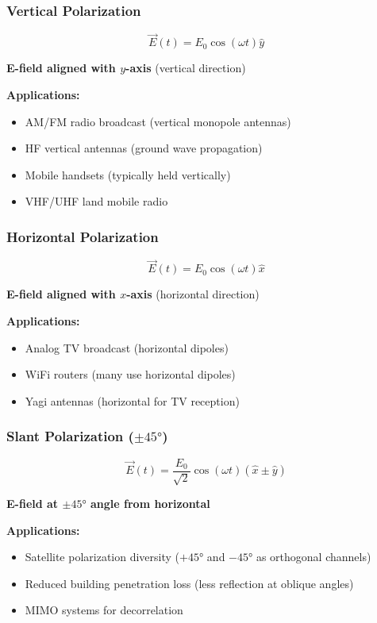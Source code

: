 \subsubsection{Vertical Polarization}
\begin{equation}
\vec{E}(t) = E_0 \cos(\omega t)\hat{y}
\label{eq:vertical-pol}
\end{equation}

\textbf{E-field aligned with $y$-axis} (vertical direction)

\textbf{Applications:}
\begin{itemize}
\item AM/FM radio broadcast (vertical monopole antennas)
\item HF vertical antennas (ground wave propagation)
\item Mobile handsets (typically held vertically)
\item VHF/UHF land mobile radio
\end{itemize}

\subsubsection{Horizontal Polarization}
\begin{equation}
\vec{E}(t) = E_0 \cos(\omega t)\hat{x}
\label{eq:horizontal-pol}
\end{equation}

\textbf{E-field aligned with $x$-axis} (horizontal direction)

\textbf{Applications:}
\begin{itemize}
\item Analog TV broadcast (horizontal dipoles)
\item WiFi routers (many use horizontal dipoles)
\item Yagi antennas (horizontal for TV reception)
\end{itemize}

\subsubsection{Slant Polarization ($\pm 45°$)}
\begin{equation}
\vec{E}(t) = \frac{E_0}{\sqrt{2}} \cos(\omega t)(\hat{x} \pm \hat{y})
\label{eq:slant-pol}
\end{equation}

\textbf{E-field at $\pm 45°$ angle from horizontal}

\textbf{Applications:}
\begin{itemize}
\item Satellite polarization diversity ($+45°$ and $-45°$ as orthogonal channels)
\item Reduced building penetration loss (less reflection at oblique angles)
\item MIMO systems for decorrelation
\end{itemize}

